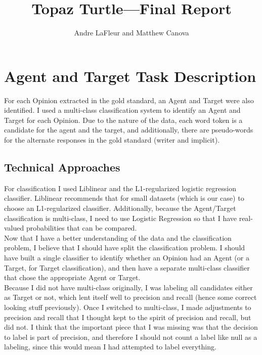 \documentclass{article}
\title{Topaz Turtle---Final Report}
\author{Andre LaFleur and Matthew Canova}
\begin{document}
    \maketitle

     
       \section{Agent and Target Task Description}
       
       For each Opinion extracted in the gold standard, an Agent and Target were also identified. I used a multi-class classification system to identify an Agent and Target for each Opinion. Due to the nature of the data, each word token is a candidate for the agent and the target, and additionally, there are pseudo-words for the alternate responses in the gold standard (writer and implicit). 
       
      \subsection{Technical Approaches}
For classification I used Liblinear and the L1-regularized logistic regression classifier. Liblinear recommends that for small datasets (which is our case) to choose an L1-regularized classifier. Additionally, because the Agent/Target classification is multi-class, I need to use Logistic Regression so that I have real-valued probabilities that can be compared. \\ 

Now that I have a better understanding of the data and the classification problem, I believe that I should have split the classification problem. I should have built a single classifier to identify whether an Opinion had an Agent (or a Target, for Target classification), and then have a separate multi-class classifier that chose the appropriate Agent or Target.\\

Because I did not have multi-class originally, I was labeling all candidates either as Target or not, which lent itself well to precision and recall (hence some correct looking stuff previously). Once I switched to multi-class, I made adjustments to precision and recall that I thought kept to the spirit of precision and recall, but did not. I think that the important piece that I was missing was that the decision to label is part of precision, and therefore I should not count a label like null as a labeling, since this would mean I had attempted to label everything. \\
\end{document}
